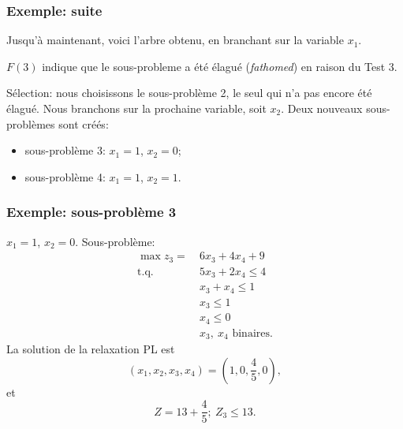 \documentclass[usepdftitle=false]{beamer}
\def\st{\mbox{t.q. }}
\begin{document}
\begin{frame}
\frametitle{Exemple: suite}

Jusqu'à maintenant, voici l'arbre obtenu, en branchant sur la variable $x_1$.
\begin{center}
\end{center}
$F(3)$ indique que le sous-probleme a été élagué ({\sl fathomed}) en raison du Test 3.

\mbox{}

Sélection: nous choisissons le sous-problème 2, le seul qui n'a pas encore été élagué.
Nous branchons sur la prochaine variable, soit $x_2$.
Deux nouveaux sous-problèmes sont créés:
\begin{itemize}
\item
sous-problème 3: $x_1 = 1$, $x_2 = 0$;
\item
sous-problème 4: $x_1 = 1$, $x_2 = 1$.
\end{itemize}

\end{frame}

\begin{frame}
\frametitle{Exemple: sous-problème 3}

$x_1 = 1$, $x_2 = 0$. Sous-problème:
\begin{align*}
\max z_3 =\ & 6x_3 + 4x_4 + 9 \\
\st{} & 5 x_3 + 2x_4 \leq 4 \\
& x_3 + x_4 \leq 1 \\
& x_3 \leq 1 \\
& x_4 \leq 0 \\
& x_3,\ x_4 \mbox{ binaires}.
\end{align*}
La solution de la relaxation PL est
\[
( x_1, x_2, x_3, x_4) = \left(1,0, \frac{4}{5},0 \right),
\]
et
\[
Z = 13+\frac{4}{5};\ Z_3 \leq 13.
\]

\end{frame}
\end{document}
